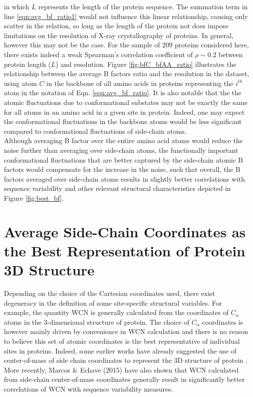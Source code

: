 \documentclass[11pt]{article}
\begin{document}
\begin{appendices}
    \noindent in which $L$ represents the length of the protein sequence. The summation term in line \ref{eqn:avg_bf_ratio1} would not influence this linear relationship, causing only scatter in the relation, so long as the length of the protein not does impose limitations on the resolution of X-ray crystallography of proteins. In general, however this may not be the case. For the sample of 209 proteins considered here, there exists indeed a weak Spearman's correlation coefficient of $\rho\sim0.2$ between protein length ($L$) and resolution. Figure \ref{fig:bfC_bfAA_ratio} illustrates the relationship between the average B factors ratio and the resolution in the dataset, using atom $C$ in the backbone of all amino acids in proteins representing the $i^{th}$ atom in the notation of Eqn. \ref{eqn:avg_bf_ratio}. It is also notable that the the atomic fluctuations due to conformational substates may not be exactly the same for all atoms in an amino acid in a given site in protein. Indeed, one may expect the conformational fluctuations in the backbone atoms would be less significant compared to conformational fluctuations of side-chain atoms. \\

    Although averaging B factor over the entire amino acid atoms would reduce the noise further than averaging over side-chain atoms, the functionally important conformational fluctuations that are better captured by the side-chain atomic B factors would compensate for the increase in the noise, such that overall, the B factors averaged over side-chain atoms results in slightly better correlations with sequence variability and other relevant structural characteristics depicted in Figure \ref{fig:best_bf}. \\

\section{Average Side-Chain Coordinates as the Best Representation of Protein 3D Structure}
\label{app:best_crd}

    Depending on the choice of the Cartesian coordinates used, there exist degeneracy in the definition of some site-specific structural variables. For example, the quantity WCN is generally calculated from the coordinates of $C_\alpha$ atoms in the 3-dimensional structure of protein. The choice of $C_\alpha$ coordinates is however mainly driven by convenience in WCN calculation and there is no reason to believe this set of atomic coordinates is the best representative of individual sites in proteins. Indeed, some earlier works have already suggested the use of center-of-mass of side chain coordinates to represent the 3D structure of protein \cite{soyer_voronoi_2000}. More recently, Marcos \& Echave (2015) \cite{marcos_too_2015} have also shown that WCN calculated from side-chain center-of-mass coordinates generally result in significantly better correlations of WCN with sequence variability measures. \\


\end{appendices}
\end{document}
